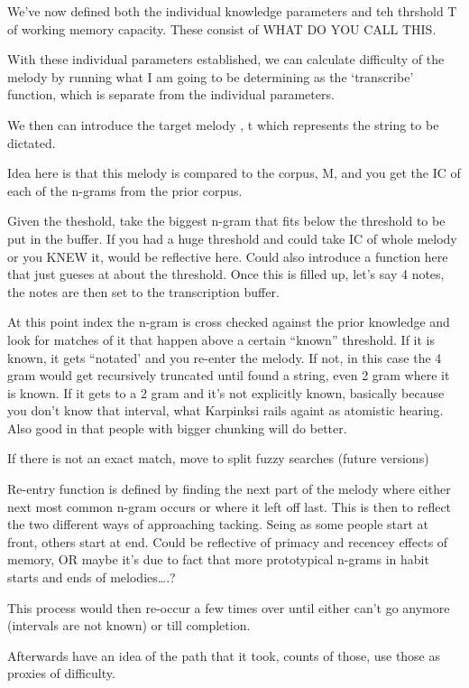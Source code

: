 \documentclass[]{book}
\theoremstyle{definition}
\theoremstyle{definition}
\theoremstyle{definition}
\theoremstyle{remark}
\begin{document}
We've now defined both the individual knowledge parameters and teh
thrshold T of working memory capacity. These consist of WHAT DO YOU CALL
THIS.

With these individual parameters established, we can calculate
difficulty of the melody by running what I am going to be determining as
the `transcribe' function, which is separate from the individual
parameters.

We then can introduce the target melody , t which represents the string
to be dictated.

Idea here is that this melody is compared to the corpus, M, and you get
the IC of each of the n-grams from the prior corpus.

Given the theshold, take the biggest n-gram that fits below the
threshold to be put in the buffer. If you had a huge threshold and could
take IC of whole melody or you KNEW it, would be reflective here. Could
also introduce a function here that just gueses at about the threshold.
Once this is filled up, let's say 4 notes, the notes are then set to the
transcription buffer.

At this point index the n-gram is cross checked against the prior
knowledge and look for matches of it that happen above a certain
``known'' threshold. If it is known, it gets ``notated' and you re-enter
the melody. If not, in this case the 4 gram would get recursively
truncated until found a string, even 2 gram where it is known. If it
gets to a 2 gram and it's not explicitly known, basically because you
don't know that interval, what Karpinksi rails againt as atomistic
hearing. Also good in that people with bigger chunking will do better.

If there is not an exact match, move to split fuzzy searches (future
versions)

Re-entry function is defined by finding the next part of the melody
where either next most common n-gram occurs or where it left off last.
This is then to reflect the two different ways of approaching tacking.
Seing as some people start at front, others start at end. Could be
reflective of primacy and recencey effects of memory, OR maybe it's due
to fact that more prototypical n-grams in habit starts and ends of
melodies\ldots{}.?

This process would then re-occur a few times over until either can't go
anymore (intervals are not known) or till completion.

Afterwards have an idea of the path that it took, counts of those, use
those as proxies of difficulty.
\end{document}
